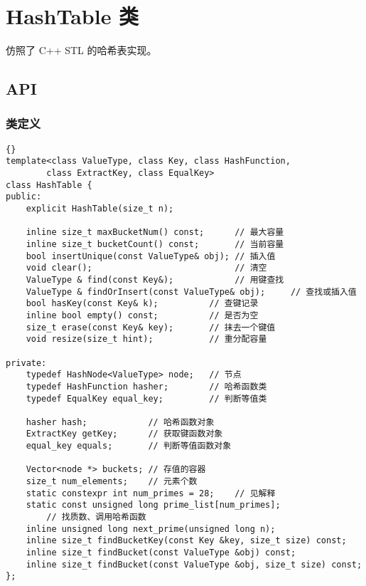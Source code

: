 \chapter{HashTable 类}

仿照了 C++ STL 的哈希表实现。

\section{API}

\subsection{类定义}
{
\begin{lstlisting}[firstnumber=550, caption=HashTable 类定义]{}
template<class ValueType, class Key, class HashFunction,
        class ExtractKey, class EqualKey>
class HashTable {
public:
    explicit HashTable(size_t n);

    inline size_t maxBucketNum() const;      // 最大容量
    inline size_t bucketCount() const;       // 当前容量
    bool insertUnique(const ValueType& obj); // 插入值
    void clear();                            // 清空
    ValueType & find(const Key&);            // 用键查找
    ValueType & findOrInsert(const ValueType& obj);     // 查找或插入值
    bool hasKey(const Key& k);          // 查键记录
    inline bool empty() const;          // 是否为空
    size_t erase(const Key& key);       // 抹去一个键值
    void resize(size_t hint);           // 重分配容量

private:
    typedef HashNode<ValueType> node;   // 节点
    typedef HashFunction hasher;        // 哈希函数类
    typedef EqualKey equal_key;         // 判断等值类

    hasher hash;            // 哈希函数对象
    ExtractKey getKey;      // 获取键函数对象
    equal_key equals;       // 判断等值函数对象

    Vector<node *> buckets; // 存值的容器
    size_t num_elements;    // 元素个数
    static constexpr int num_primes = 28;    // 见解释
    static const unsigned long prime_list[num_primes];
        // 找质数、调用哈希函数
    inline unsigned long next_prime(unsigned long n);
    inline size_t findBucketKey(const Key &key, size_t size) const;
    inline size_t findBucket(const ValueType &obj) const;
    inline size_t findBucket(const ValueType &obj, size_t size) const;
};
\end{lstlisting}


}

